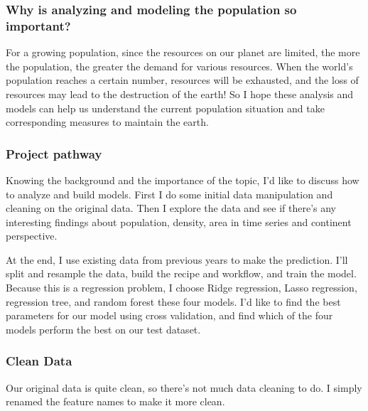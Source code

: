 \documentclass[
]{article}
\begin{document}
\hypertarget{why-is-analyzing-and-modeling-the-population-so-important}{%
\subsubsection{Why is analyzing and modeling the population so
important?}\label{why-is-analyzing-and-modeling-the-population-so-important}}

For a growing population, since the resources on our planet are limited,
the more the population, the greater the demand for various resources.
When the world's population reaches a certain number, resources will be
exhausted, and the loss of resources may lead to the destruction of the
earth! So I hope these analysis and models can help us understand the
current population situation and take corresponding measures to maintain
the earth.

\hypertarget{project-pathway}{%
\subsubsection{Project pathway}\label{project-pathway}}

Knowing the background and the importance of the topic, I'd like to
discuss how to analyze and build models. First I do some initial data
manipulation and cleaning on the original data. Then I explore the data
and see if there's any interesting findings about population, density,
area in time series and continent perspective.

At the end, I use existing data from previous years to make the
prediction. I'll split and resample the data, build the recipe and
workflow, and train the model. Because this is a regression problem, I
choose Ridge regression, Lasso regression, regression tree, and random
forest these four models. I'd like to find the best parameters for our
model using cross validation, and find which of the four models perform
the best on our test dataset.

\hypertarget{clean-data}{%
\subsubsection{Clean Data}\label{clean-data}}

Our original data is quite clean, so there's not much data cleaning to
do. I simply renamed the feature names to make it more clean.
\end{document}
